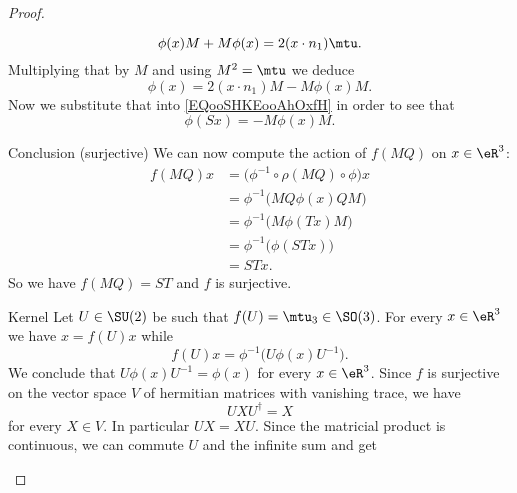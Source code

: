 \begin{proof}
\begin{subproof}
\begin{subproof}
\begin{equation}
                        \phi(x)M+M\phi(x)=2(x\cdot n_1)\mtu.
                    \end{equation}
                    Multiplying that by \( M\) and using \( M^2=\mtu\) we deduce
                    \begin{equation}
                        \phi(x)=2(x\cdot n_1)M-M\phi(x)M.
                    \end{equation}
                    Now we substitute that into \eqref{EQooSHKEooAhOxfH} in order to see that
                    \begin{equation}
                        \phi(Sx)=-M\phi(x)M.
                    \end{equation}
                \item[Conclusion (surjective)]
                    We can now compute the action of \( f(MQ)\) on \( x\in \eR^3\):
                    \begin{subequations}
                        \begin{align}
                            f(MQ)x&=\big( \phi^{-1}\circ\rho(MQ)\circ\phi \big)x\\
                            &=\phi^{-1}\big( MQ\phi(x)QM \big)\\
                            &=\phi^{-1}\big( M\phi(Tx)M \big)\\
                            &=\phi^{-1}\big( \phi(STx) \big)\\
                            &=STx.
                        \end{align}
                    \end{subequations}
                    So we have \( f(MQ)=ST\) and \( f\) is surjective.
            \end{subproof}
        \item[Kernel]
            Let \( U\in \SU(2)\) be such that \( f(U)=\mtu_3\in \SO(3)\). For every \( x\in \eR^3\) we have \( x=f(U)x\) while
            \begin{equation}
                f(U)x=\phi^{-1}\big( U\phi(x)U^{-1} \big).
            \end{equation}
            We conclude that \( U\phi(x)U^{-1}=\phi(x)\) for every \( x\in \eR^3\). Since \( f\) is surjective on the vector space \( V\) of hermitian matrices with vanishing trace, we have
            \begin{equation}
                UXU^{\dag}=X
            \end{equation}
            for every \( X\in V\). In particular \( UX=XU\). Since the matricial product is continuous, we can commute \( U\) and the infinite sum and get

\end{subproof}
\end{proof}
